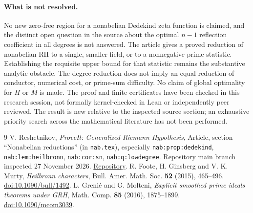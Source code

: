 \documentclass[11pt]{article}
\theoremstyle{remark}\newtheorem{remark}[theorem]{Remark}
\newcommand{\source}{\texttt{nab:q:lowdegree}}
\begin{document}
\paragraph{What is not resolved.} No new zero-free region for a nonabelian
Dedekind zeta function is claimed, and the distinct open question in the source
about the optimal $n-1$ reflection coefficient in all degrees is not answered.
The article gives a proved reduction of nonabelian RH to a single, smaller
field, or to a nonnegative prime statistic. Establishing the requisite upper
bound for that statistic remains the substantive analytic obstacle. The degree
reduction does not imply an equal reduction of conductor, numerical cost, or
prime-sum difficulty. No claim of global optimality for $H$ or $M$ is made.
The proof and finite certificates have been checked in this research session,
not formally kernel-checked in Lean or independently peer reviewed. The
result is new relative to the inspected source section; an exhaustive priority
search across the mathematical literature has not been performed.

\begin{thebibliography}{9}
 V. Reshetnikov, \emph{ProveIt: Generalized Riemann Hypothesis},
Article, section ``Nonabelian reductions'' (in \texttt{nab.tex}), especially
\texttt{nab:prop:dedekind}, \texttt{nab:lem:heilbronn}, \texttt{nab:cor:sn},
\source{}. Repository main branch inspected 27 November 2026.
\href{https://github.com/VladimirReshetnikov/ProveIt/tree/main/Analysis/GeneralizedRiemannHypothesis}{Repository}.
 R. Foote, H. Ginsberg and V. K. Murty, \emph{Heilbronn characters},
Bull. Amer. Math. Soc. \textbf{52} (2015), 465--496.
\href{https://doi.org/10.1090/bull/1492}{doi:10.1090/bull/1492}.
 L. Greni\'e and G. Molteni, \emph{Explicit smoothed prime ideals
 theorems under GRH}, Math. Comp. \textbf{85} (2016), 1875--1899.
\href{https://doi.org/10.1090/mcom3039}{doi:10.1090/mcom3039}.
\end{thebibliography}
\end{document}
